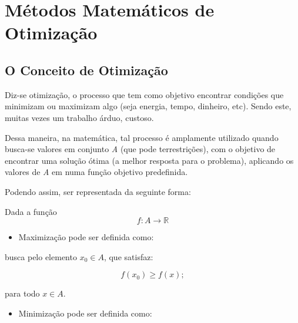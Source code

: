 

\chapter{\Large{Métodos Matemáticos de Otimização}}\label{chp:1}


\section{{O Conceito de Otimização}}

\hspace{0.8cm}
Diz-se otimização, o processo que tem como objetivo encontrar condições que
minimizam ou maximizam algo (seja energia, tempo, dinheiro, etc). Sendo este,
muitas vezes um trabalho árduo, custoso.

Dessa maneira, na matemática, tal processo é amplamente utilizado quando
busca-se valores em conjunto \textit{A} (que pode terrestrições), com o
objetivo de encontrar uma solução ótima (a melhor resposta para o problema),
aplicando os valores de \textit{A} em numa função objetivo predefinida.

Podendo assim, ser representada da seguinte forma:

    Dada a função
        \begin{equation}
            f : A \rightarrow \mathbb{R}
        \end{equation}

        \begin{itemize}
                \item Maximização pode ser definida como:
        \end{itemize}

                busca pelo elemento \(x_0 \in A\), que satisfaz:

                    \begin{equation}
                        f(x_0) \geq f(x);
                    \end{equation}

                para todo \(x \in A\).

        \begin{itemize}
                \item Minimização pode ser definida como:
        \end{itemize}

